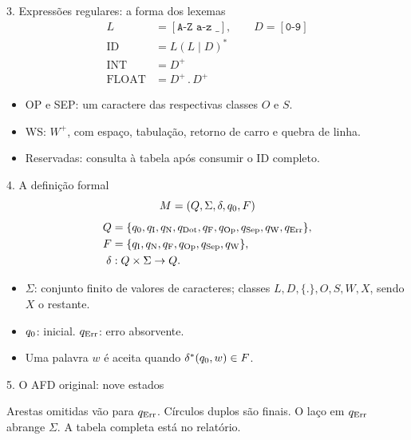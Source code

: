 \documentclass[aspectratio=169,11pt]{beamer}
\begin{document}
\begin{frame}{3. Expressões regulares: a forma dos lexemas}
\begin{align*}
L&=[\texttt{A-Z a-z \_}],\qquad D=[\texttt{0-9}]\\
\mathrm{ID}&=L(L\mid D)^*\\
\mathrm{INT}&=D^+\\
\mathrm{FLOAT}&=D^+\,\texttt{.}\,D^+
\end{align*}
\begin{itemize}
\item OP e SEP: um caractere das respectivas classes $O$ e $S$.
\item WS: $W^+$, com espaço, tabulação, retorno de carro e quebra de linha.
\item Reservadas: consulta à tabela após consumir o ID completo.
\end{itemize}
\end{frame}

\begin{frame}{4. A definição formal}
\[
M=(Q,\Sigma,\delta,q_{\mathrm{0}},F)
\]
\begin{align*}
Q&=\{q_{\mathrm{0}},q_{\mathrm{I}},q_{\mathrm{N}},q_{\mathrm{Dot}},q_{\mathrm{F}},q_{\mathrm{Op}},q_{\mathrm{Sep}},q_{\mathrm{W}},q_{\mathrm{Err}}\},\\
F&=\{q_{\mathrm{I}},q_{\mathrm{N}},q_{\mathrm{F}},q_{\mathrm{Op}},q_{\mathrm{Sep}},q_{\mathrm{W}}\},\\
\delta&:Q\times\Sigma\to Q.
\end{align*}
\begin{itemize}
\item $\Sigma$: conjunto finito de valores de caracteres; classes
$L,D,\{.\},O,S,W,X$, sendo $X$ o restante.
\item $q_{\mathrm{0}}$: inicial. $q_{\mathrm{Err}}$: erro absorvente.
\item Uma palavra $w$ é aceita quando $\delta^*(q_{\mathrm{0}},w)\in F$.
\end{itemize}
\end{frame}

\begin{frame}{5. O AFD original: nove estados}
\begin{center}\resizebox{!}{.64\textheight}{}\end{center}
\small Arestas omitidas vão para $q_{\mathrm{Err}}$. Círculos duplos são finais.
O laço em $q_{\mathrm{Err}}$ abrange $\Sigma$. A tabela completa está no relatório.
\end{frame}
\end{document}
